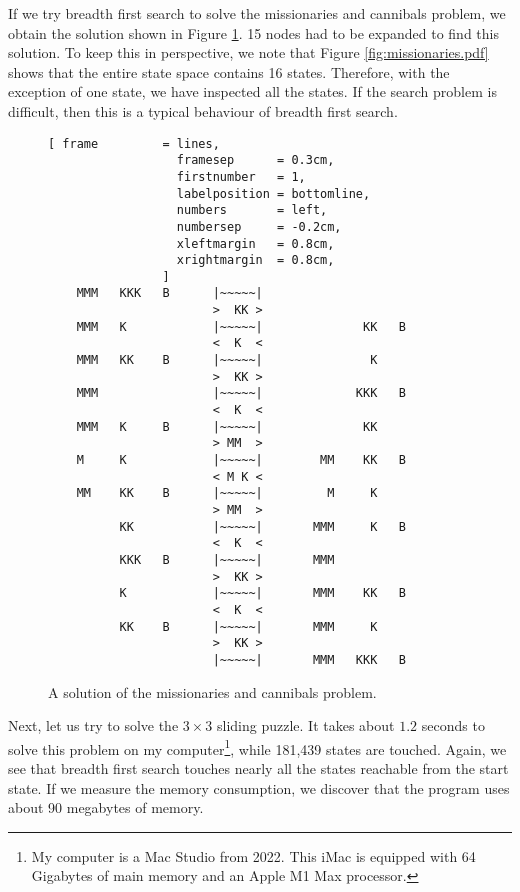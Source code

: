 If we try breadth first search to solve the missionaries and cannibals problem, we obtain
the solution shown in Figure \ref{fig:missionaries.solution}.  15 nodes had to be expanded to find
this solution.  To keep this in perspective, we note that Figure \ref{fig:missionaries.pdf} shows
that the entire state space contains 16 states.  Therefore, with the exception of one state, we have
inspected all the states.  If the search problem is difficult, then this is a typical behaviour of breadth
first search. 

\begin{figure}[!ht]
\centering
\begin{Verbatim}[ frame         = lines,
                  framesep      = 0.3cm,
                  firstnumber   = 1,
                  labelposition = bottomline,
                  numbers       = left,
                  numbersep     = -0.2cm,
                  xleftmargin   = 0.8cm,
                  xrightmargin  = 0.8cm,
                ]
    MMM   KKK   B      |~~~~~|
                       >  KK >
    MMM   K            |~~~~~|              KK   B
                       <  K  <
    MMM   KK    B      |~~~~~|               K
                       >  KK >
    MMM                |~~~~~|             KKK   B
                       <  K  <
    MMM   K     B      |~~~~~|              KK
                       > MM  >
    M     K            |~~~~~|        MM    KK   B
                       < M K <
    MM    KK    B      |~~~~~|         M     K
                       > MM  >
          KK           |~~~~~|       MMM     K   B
                       <  K  <
          KKK   B      |~~~~~|       MMM
                       >  KK >
          K            |~~~~~|       MMM    KK   B
                       <  K  <
          KK    B      |~~~~~|       MMM     K
                       >  KK >
                       |~~~~~|       MMM   KKK   B
\end{Verbatim}
\vspace*{-0.3cm}
\caption{A solution of the missionaries and cannibals problem.}
\label{fig:missionaries.solution}
\end{figure}

Next, let us try to solve the $3 \times 3$ sliding puzzle.  It takes about $1.2$ seconds to solve
this problem on my computer\footnote{
  My computer is a Mac Studio from 2022.  This iMac is equipped with 64 Gigabytes of main memory and an
  Apple M1 Max processor.
}, while 181,439 states are touched.  
Again, we see that breadth first search touches nearly all the states reachable from the start state.
If we measure the memory consumption, we discover that the program uses about 90 megabytes of memory.

